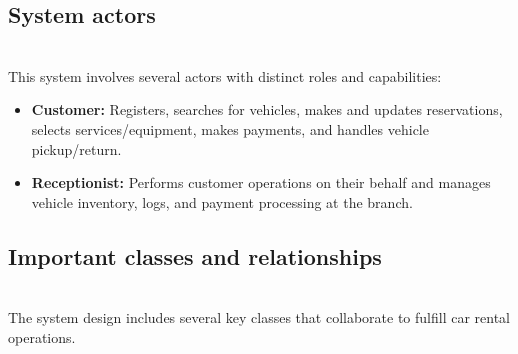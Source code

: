 \subsection{System actors}\label{OsOwlFNnNpZBy6xV6dliA}
\\
This system involves several actors with distinct roles and capabilities:

\begin{itemize}
\item
\protect{}\label{WC-aeyJ4rHlIMclPMesOs}
\textbf{Customer:} Registers, searches for vehicles, makes and updates reservations, selects services/equipment, makes payments, and handles vehicle pickup/return.
\item
\protect{}\label{9a0zKwHWxWNXEGTlG3R_4}
\textbf{Receptionist:} Performs customer operations on their behalf and manages vehicle inventory, logs, and payment processing at the branch.
\end{itemize}

\subsection{Important classes and relationships}\label{j58j__w3p5WMfw4rvOcKY}
\\
The system design includes several key classes that collaborate to fulfill car rental operations.

